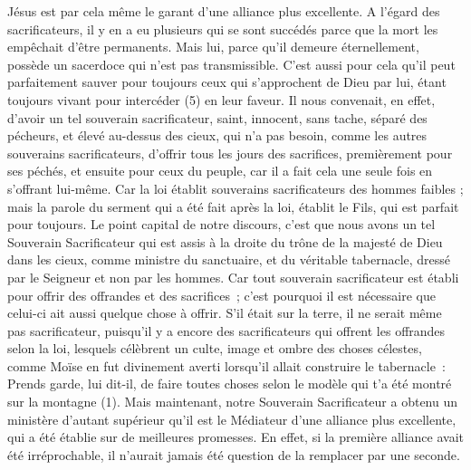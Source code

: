 \begin{multicols}{2}
Jésus est par cela même le garant d’une alliance plus excellente.
A l’égard des sacrificateurs, il y en a eu plusieurs qui se sont succédés parce que la mort les empêchait d’être permanents.
Mais lui, parce qu'il demeure éternellement, possède un sacerdoce qui n’est pas transmissible.
C'est aussi pour cela qu’il peut parfaitement sauver pour toujours ceux qui s'approchent de Dieu par lui, étant toujours vivant pour intercéder (5) en leur faveur.
Il nous convenait, en effet, d'avoir un tel souverain sacrificateur, saint, innocent, sans tache, séparé des pécheurs, et élevé au-dessus des cieux,
qui n’a pas besoin, comme les autres souverains sacrificateurs, d'offrir tous les jours des sacrifices, premièrement pour ses péchés, et ensuite pour ceux du peuple, car il a fait cela une seule fois en s’offrant lui-même.
Car la loi établit souverains sacrificateurs des hommes faibles ; mais la parole du serment qui a été fait après la loi, établit le Fils, qui est parfait pour toujours.
\VerseOne{}Le point capital de notre discours, c'est que nous avons un tel Souverain Sacrificateur qui est assis à la droite du trône de la majesté de Dieu dans les cieux,
comme ministre du sanctuaire, et du véritable tabernacle, dressé par le Seigneur et non par les hommes.
Car tout souverain sacrificateur est établi pour offrir des offrandes et des sacrifices ; c'est pourquoi il est nécessaire que celui-ci ait aussi quelque chose à offrir.
S’il était sur la terre, il ne serait même pas sacrificateur, puisqu’il y a encore des sacrificateurs qui offrent les offrandes selon la loi,
lesquels célèbrent un culte, image et ombre des choses célestes, comme Moïse en fut divinement averti lorsqu’il allait construire le tabernacle : Prends garde, lui dit-il, de faire toutes choses selon le modèle qui t'a été montré sur la montagne (1).
Mais maintenant, notre Souverain Sacrificateur a obtenu un ministère d'autant supérieur qu'il est le Médiateur d'une alliance plus excellente, qui a été établie sur de meilleures promesses.
En effet, si la première alliance avait été irréprochable, il n’aurait jamais été question de la remplacer par une seconde.

\end{multicols}

